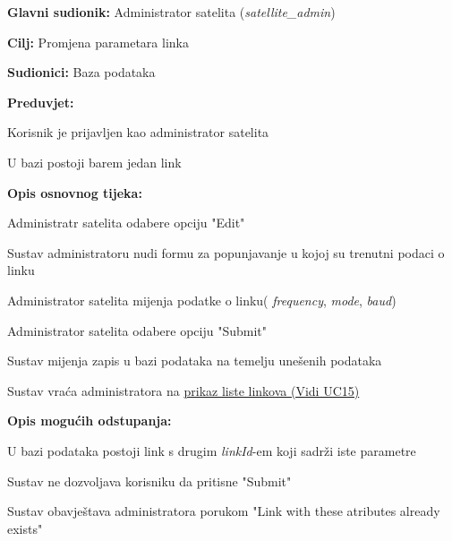 				\noindent {}
			\begin{packed_item}
				
				\item \textbf{Glavni sudionik: }Administrator satelita (\textit{satellite\_admin})
				\item  \textbf{Cilj: }Promjena parametara linka
				\item  \textbf{Sudionici: }Baza podataka
				\item  \textbf{Preduvjet: }
				\begin{packed_enum}
					\item Korisnik je prijavljen kao administrator satelita
				\item U bazi postoji barem jedan link	\end{packed_enum}
				\item  \textbf{Opis osnovnog tijeka: }
				
				\item[] \begin{packed_enum}
					\item Administratr satelita odabere opciju "Edit"
					\item Sustav administratoru nudi formu za popunjavanje u kojoj su trenutni podaci o linku
					\item Administrator satelita mijenja podatke o linku( \textit{frequency}, \textit{mode}, \textit{baud})
					\item Administrator satelita odabere opciju  "Submit"
					\item Sustav mijenja zapis u bazi podataka na temelju unešenih podataka
					\item Sustav vraća administratora na \hyperref[UC15]{prikaz liste linkova (Vidi UC15)} 
					
				\end{packed_enum}
				
				\item  \textbf{Opis mogućih odstupanja: }
				
				\item[] \begin{packed_enum}
					
					\item[1] U bazi podataka postoji link s drugim \textit{linkId}-em koji sadrži iste parametre
					\item[ ] \begin{packed_enum}
						
						\item[1.1] Sustav ne dozvoljava korisniku da pritisne "Submit"
						\item[1.2] Sustav obavještava administratora porukom "Link with these atributes already exists"
					\end{packed_enum}
				\end{packed_enum}
			\end{packed_item}


